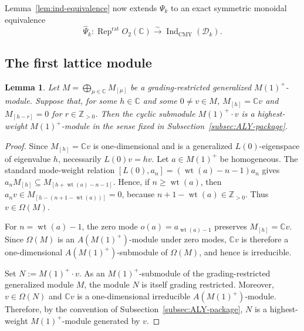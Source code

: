 \documentclass[12pt,leqno]{amsart}
\numberwithin{equation}{section} \newtheorem{thm}{Theorem}[section] \newtheorem{lem}[thm]{Lemma} \newtheorem{ex}[thm]{Example} \newtheorem{prop}[thm]{Proposition} \newtheorem{cor}[thm]{Corollary} \newtheorem{defi}[thm]{Definition} \newtheorem{rmk}[thm]{Remark} \newtheorem{notation}[thm]{Notation}
\newcommand{\wt}{\operatorname{wt}}
\newcommand{\Rep}{\operatorname{Rep}}
\newcommand{\Dk}{\mathcal D_k}
\newcommand{\IndCMY}{\operatorname{Ind}_{\mathrm{CMY}}}
\newcommand{\Otwo}{O_2(\C)}
\def\Z{\mathbb{Z}} \def\N{\mathbb{N}} \def\A{\mathbb{A}} \def\C{\mathbb{C}} \def\R{\mathbb{R}} \def\Q{\mathbb{Q}} \def\F{\mathbb{F}}
\begin{document}
Lemma~\ref{lem:ind-equivalence} now extends $\Psi_k$ to an exact symmetric monoidal equivalence
\[
\widehat\Psi_k:\Rep^{\mathrm{rat}}\Otwo\overset\sim\longrightarrow\IndCMY(\Dk).
\]
\subsection{The first lattice module}

\begin{lem}\label{lem:M1plus-lowest-line}
Let $M=\bigoplus_{\mu\in\C}M_{[\mu]}$ be a grading-restricted generalized $M(1)^+$-module. Suppose that, for some $h\in\C$ and some $0\ne v\in M$, \(M_{[h]}=\C v\) and \(M_{[h-r]}=0\) for \(r\in\Z_{>0}\). Then the cyclic submodule $M(1)^+\cdot v$ is a highest-weight $M(1)^+$-module in the sense fixed in Subsection~\ref{subsec:ALY-package}.
\end{lem}

\begin{proof}
Since $M_{[h]}=\C v$ is one-dimensional and is a generalized $L(0)$-eigenspace of eigenvalue $h$, necessarily $L(0)v=hv$. Let $a\in M(1)^+$ be homogeneous. The standard mode-weight relation \([L(0),a_n]=(\wt(a)-n-1)a_n\) gives \(a_nM_{[h]}\subseteq M_{[h+\wt(a)-n-1]}\). Hence, if $n\ge\wt(a)$, then \(a_nv\in M_{[h-(n+1-\wt(a))]}=0\), because $n+1-\wt(a)\in\Z_{>0}$. Thus $v\in\Omega(M)$.

For $n=\wt(a)-1$, the zero mode $o(a)=a_{\wt(a)-1}$ preserves $M_{[h]}=\C v$. Since $\Omega(M)$ is an $A(M(1)^+)$-module under zero modes, $\C v$ is therefore a one-dimensional $A(M(1)^+)$-submodule of $\Omega(M)$, and hence is irreducible.

Set $N:=M(1)^+\cdot v$. As an $M(1)^+$-submodule of the grading-restricted generalized module $M$, the module $N$ is itself grading restricted. Moreover, $v\in\Omega(N)$ and $\C v$ is a one-dimensional irreducible $A(M(1)^+)$-module. Therefore, by the convention of Subsection~\ref{subsec:ALY-package}, $N$ is a highest-weight $M(1)^+$-module generated by $v$.
\end{proof}
\end{document}
